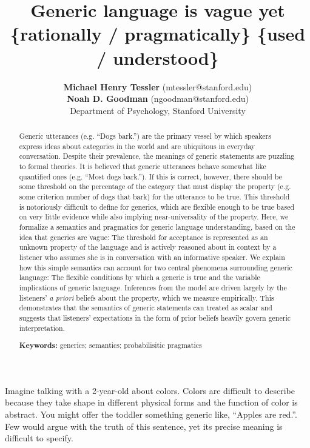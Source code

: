 \documentclass[10pt,letterpaper]{article}
\title{Generic language is vague yet \{rationally / pragmatically\} \{used / understood\}}
\author{{\large \bf Michael Henry Tessler} (mtessler@stanford.edu)\\ {\large \bf Noah D. Goodman} (ngoodman@stanford.edu) \\
  Department of Psychology, Stanford University}
\begin{document}
\maketitle


\begin{abstract}
Generic utterances (e.g. ``Dogs bark.'') are the primary vessel by which speakers express ideas about categories in the world and are ubiquitous in everyday conversation. 
Despite their prevalence, the meanings of generic statements are puzzling to formal theories. 
It is believed that generic utterances behave somewhat like quantified ones (e.g. ``Most dogs bark.''). 
If this is correct, however, there should be some threshold on the percentage of the category that must display the property (e.g. some criterion number of dogs that bark) for the utterance to be true.
This threshold is notoriously difficult to define for generics, which are flexible enough to be true based on very little evidence while also implying near-universality of the property. 
Here, we formalize a semantics and pragmatics for generic language understanding, based on the idea that generics are vague: The threshold for acceptance is represented as an unknown property of the language and is actively reasoned about in context by a listener who assumes she is in conversation with an informative speaker. 
We explain how this simple semantics can account for two central phenomena surrounding generic language: The flexible conditions by which a generic is true and the variable implications of generic language. 
Inferences from the model are driven largely by the listeners' \emph{a priori} beliefs about the property, which we measure empirically.
This demonstrates that the semantics of generic statements can treated as scalar and suggests that listeners' expectations in the form of prior beliefs heavily govern generic interpretation. 


\textbf{Keywords:} 
generics; semantics; probabilisitic pragmatics
\end{abstract}

Imagine talking with a 2-year-old about colors.
Colors are difficult to describe because they take shape in different physical forms and the function of color is abstract.
You might offer the toddler something generic like, ``Apples are red.''. 
Few would argue with the truth of this sentence, yet its precise meaning is difficult to specify. 
\end{document}
